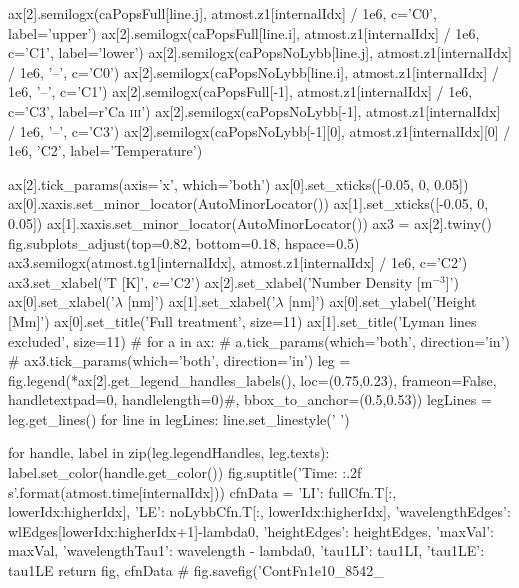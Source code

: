 \begin{pycode}[TimeDepRT]
    ax[2].semilogx(caPopsFull[line.j], atmost.z1[internalIdx] / 1e6, c='C0', label='upper')
    ax[2].semilogx(caPopsFull[line.i], atmost.z1[internalIdx] / 1e6, c='C1', label='lower')
    ax[2].semilogx(caPopsNoLybb[line.j], atmost.z1[internalIdx] / 1e6, '--', c='C0')
    ax[2].semilogx(caPopsNoLybb[line.i], atmost.z1[internalIdx] / 1e6, '--', c='C1')
    ax[2].semilogx(caPopsFull[-1], atmost.z1[internalIdx] / 1e6, c='C3', label=r'Ca \textsc{iii}')
    ax[2].semilogx(caPopsNoLybb[-1], atmost.z1[internalIdx] / 1e6, '--', c='C3')
    ax[2].semilogx(caPopsNoLybb[-1][0], atmost.z1[internalIdx][0] / 1e6, 'C2', label='Temperature')

    ax[2].tick_params(axis='x', which='both')
    ax[0].set_xticks([-0.05, 0, 0.05])
    ax[0].xaxis.set_minor_locator(AutoMinorLocator())
    ax[1].set_xticks([-0.05, 0, 0.05])
    ax[1].xaxis.set_minor_locator(AutoMinorLocator())
    ax3 = ax[2].twiny()
    fig.subplots_adjust(top=0.82, bottom=0.18, hspace=0.5)
    ax3.semilogx(atmost.tg1[internalIdx], atmost.z1[internalIdx] / 1e6, c='C2')
    ax3.set_xlabel('T [K]', c='C2')
    ax[2].set_xlabel('Number Density [m$^{-3}$]')
    ax[0].set_xlabel('$\lambda$ [nm]')
    ax[1].set_xlabel('$\lambda$ [nm]')
    ax[0].set_ylabel('Height [Mm]')
    ax[0].set_title('Full treatment', size=11)
    ax[1].set_title('Lyman lines excluded', size=11)
    # for a in ax:
    #     a.tick_params(which='both', direction='in')
    # ax3.tick_params(which='both', direction='in')
    leg = fig.legend(*ax[2].get_legend_handles_labels(), loc=(0.75,0.23), frameon=False, handletextpad=0, handlelength=0)#, bbox_to_anchor=(0.5,0.53))
    legLines = leg.get_lines()
    for line in legLines:
        line.set_linestyle(' ')

    for handle, label in zip(leg.legendHandles, leg.texts):
        label.set_color(handle.get_color())
    fig.suptitle('Time: {:.2f} s'.format(atmost.time[internalIdx]))
    cfnData = {'LI': fullCfn.T[:, lowerIdx:higherIdx], 'LE': noLybbCfn.T[:, lowerIdx:higherIdx],
               'wavelengthEdges': wlEdges[lowerIdx:higherIdx+1]-lambda0, 'heightEdges': heightEdges, 'maxVal': maxVal, 'wavelengthTau1': wavelength - lambda0,
               'tau1LI': tau1LI, 'tau1LE': tau1LE}
    return fig, cfnData
    # fig.savefig('ContFn1e10_8542_%


\end{pycode}
